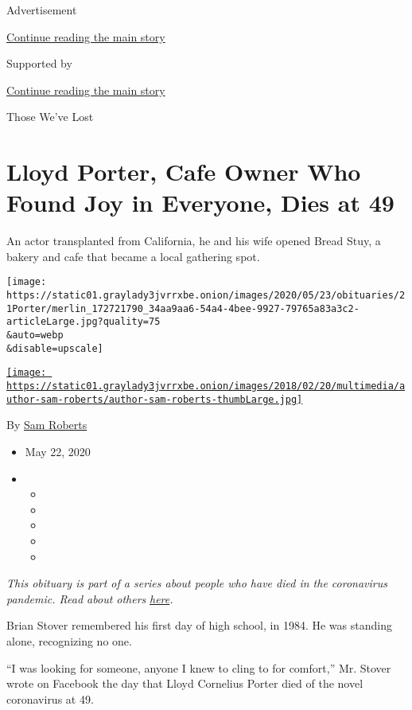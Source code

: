 Advertisement

\protect\hyperlink{after-top}{Continue reading the main story}

Supported by

\protect\hyperlink{after-sponsor}{Continue reading the main story}

Those We've Lost

\hypertarget{lloyd-porter-cafe-owner-who-found-joy-in-everyone-dies-at-49}{%
\section{Lloyd Porter, Cafe Owner Who Found Joy in Everyone, Dies at
49}\label{lloyd-porter-cafe-owner-who-found-joy-in-everyone-dies-at-49}}

An actor transplanted from California, he and his wife opened Bread
Stuy, a bakery and cafe that became a local gathering spot.

\texttt{[image: https://static01.graylady3jvrrxbe.onion/images/2020/05/23/obituaries/21Porter/merlin\_172721790\_34aa9aa6-54a4-4bee-9927-79765a83a3c2-articleLarge.jpg?quality=75\\\&auto=webp\\\&disable=upscale]}

\href{https://www.nytimes3xbfgragh.onion/by/sam-roberts}{\texttt{[image: https://static01.graylady3jvrrxbe.onion/images/2018/02/20/multimedia/author-sam-roberts/author-sam-roberts-thumbLarge.jpg]}}

By \href{https://www.nytimes3xbfgragh.onion/by/sam-roberts}{Sam Roberts}

\begin{itemize}
\item
  May 22, 2020
\item
  \begin{itemize}
  \item
  \item
  \item
  \item
  \item
  \end{itemize}
\end{itemize}

\emph{This obituary is part of a series about people who have died in
the coronavirus pandemic. Read about others}
\href{https://www.nytimes3xbfgragh.onion/series/people-who-have-died-of-the-coronavirus}{\emph{here}}\emph{.}

Brian Stover remembered his first day of high school, in 1984. He was
standing alone, recognizing no one.

``I was looking for someone, anyone I knew to cling to for comfort,''
Mr. Stover wrote on Facebook the day that Lloyd Cornelius Porter died of
the novel coronavirus at 49.

